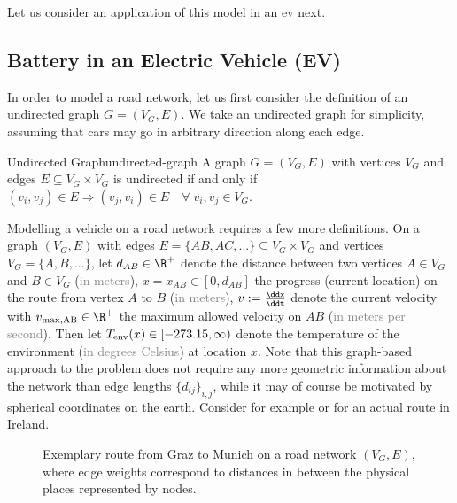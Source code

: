 \documentclass{prettytex/ox/mmsc-special-topic}
\begin{document}
  Let us consider an application of this model in an \glsdesc{ev} next.

  \subsection{Battery in an Electric Vehicle (EV)}
  In order to model a road network, let us first consider the definition of an undirected graph $G = (V_G, E)$. We take an undirected graph for simplicity, assuming that cars may go in arbitrary direction along each edge.
  \begin{definition}{Undirected Graph}{undirected-graph}
    A graph $G = (V_G, E)$ with vertices $V_G$ and edges $E \subseteq V_G \times V_G$ is undirected if and only if $(v_i, v_j) \in E \Rightarrow (v_j, v_i) \in E \quad \forall\; v_i, v_j \in V_G$.
  \end{definition}

  Modelling a vehicle on a road network requires a few more definitions.
  On a graph $(V_G, E)$ with edges $E = \{AB, AC, ...\} \subseteq V_G \times V_G$ and vertices $V_G = \{A, B, ...\}$, let
  $d_{AB} \in \R^+$ denote the distance between two vertices $A \in V_G$ and $B \in V_G$ (\textcolor{gray}{in meters}),
  $x = x_{AB} \in [0, d_{AB}]$ the progress (current location) on the route from vertex $A$ to $B$ (\textcolor{gray}{in meters}),
  $v := \frac{\ddx}{\ddt}$ denote the current velocity with
  $v_{\rm max, AB} \in \R^+$ the maximum allowed velocity on $AB$ (\textcolor{gray}{in meters per second}).
  Then let
  $T_{\rm env}(x) \in [-273.15, \infty)$ denote the temperature of the environment (\textcolor{gray}{in degrees Celsius}) at location $x$.
  Note that this graph-based approach to the problem does not require any more geometric information about the network than edge lengths $\{d_{ij}\}_{i,j}$, while it may of course be motivated by spherical coordinates on the earth.
  Consider for example  or  for an actual route in Ireland.

  \begin{figure}[H]
    \centering
    \caption{Exemplary route from Graz to Munich on a road network $(V_G, E)$, where edge weights correspond to distances in between the physical places represented by nodes.}
    \label{fig:graz-to-munich}
  \end{figure}
\end{document}
